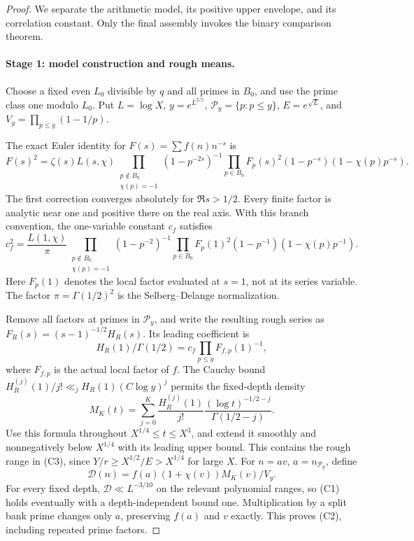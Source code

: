 \begin{proof}
We separate the arithmetic model, its positive upper envelope, and
its correlation constant. Only the final assembly invokes the binary
comparison theorem.

\paragraph{Stage 1: model construction and rough means.}
Choose a fixed even \(L_0\) divisible by \(q\) and all primes
in \(B_0\), and use the prime class one modulo \(L_0\).
Put \(L=\log X\), \(y=e^{L^{2/5}}\), \(\mathcal P_y=\{p:p\le y\}\),
\(E=e^{\sqrt L}\), and \(V_y=\prod_{p\le y}(1-1/p)\).

The exact Euler identity for \(F(s)=\sum f(n)n^{-s}\) is
\begin{equation}\label{eq:quadratic-euler-square}
 F(s)^2=\zeta(s)L(s,\chi)
 \prod_{\substack{p\notin B_0\\\chi(p)=-1}}(1-p^{-2s})^{-1}
 \prod_{p\in B_0}F_p(s)^2(1-p^{-s})(1-\chi(p)p^{-s}).
\end{equation}
The first correction converges absolutely for \(\Re s>1/2\).
Every finite factor is analytic near one and positive there on
the real axis. With this branch convention, the one-variable
constant \(c_f\) satisfies
\begin{equation}\label{eq:quadratic-marginal}
 c_f^2=\frac{L(1,\chi)}\pi
 \prod_{\substack{p\notin B_0\\\chi(p)=-1}}(1-p^{-2})^{-1}
 \prod_{p\in B_0}F_p(1)^2(1-p^{-1})(1-\chi(p)p^{-1}).
\end{equation}
Here \(F_p(1)\) denotes the local factor evaluated at \(s=1\),
not at its series variable. The factor \(\pi=\Gamma(1/2)^2\)
is the Selberg--Delange normalization.

Remove all factors at primes in \(\mathcal P_y\), and write the resulting
rough series as \(F_R(s)=(s-1)^{-1/2}H_R(s)\). Its leading
coefficient is
\[
 H_R(1)/\Gamma(1/2)
          =c_f\prod_{p\le y}F_{f,p}(1)^{-1},
\]
where \(F_{f,p}\) is the actual local factor of \(f\).
The Cauchy bound
\(H_R^{(j)}(1)/j!\ll_j H_R(1)(C\log y)^j\) permits the
fixed-depth density
\[
 M_K(t)=\sum_{j=0}^K\frac{H_R^{(j)}(1)}{j!}
              \frac{(\log t)^{-1/2-j}}{\Gamma(1/2-j)}.
\]
Use this formula throughout \(X^{1/4}\le t\le X^3\), and
extend it smoothly and nonnegatively below \(X^{1/4}\) with its
leading upper bound. This contains the rough range in (C3), since
\(Y/r\ge X^{1/2}/E>X^{1/4}\) for large \(X\).
For \(n=av\), \(a=n_{\mathcal P_y}\), define
\begin{equation}\label{eq:quadratic-model}
 \mathcal D(n)=f(a)(1+\chi(v))M_K(v)/V_y.
\end{equation}
For every fixed depth, \(\mathcal D\ll L^{-3/10}\) on the relevant
polynomial ranges, so (C1) holds eventually with a depth-independent
bound one. Multiplication by a split bank prime changes only
\(a\), preserving \(f(a)\) and \(v\) exactly. This proves (C2),
including repeated prime factors.


\end{proof}
